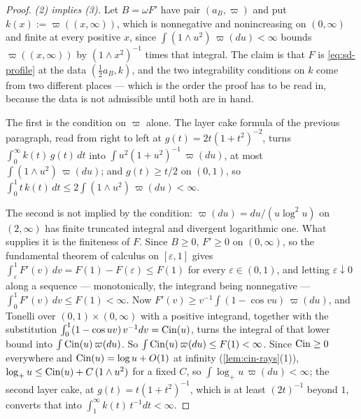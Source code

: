 \begin{proof}
\emph{(2) implies (3).} Let $B = \omega F'$ have pair $(a_B,\varpi)$ and put
$k(x) := \varpi((x,\infty))$, which is nonnegative and nonincreasing on $(0,\infty)$ and finite
at every positive $x$, since $\int (1 \wedge u^2)\,\varpi(du) < \infty$ bounds
$\varpi((x,\infty))$ by $(1 \wedge x^2)^{-1}$ times that integral. The claim is that $F$ is
\ref{eq:sd-profile} at the data $(\tfrac12 a_B, k)$, and the two integrability conditions on
$k$ come from two different places --- which is the order the proof has to be read in, because
the data is not admissible until both are in hand.

The first is the \Levy{} condition on $\varpi$ alone. The layer cake formula of the previous
paragraph, read from right to left at $g(t) = 2t(1+t^2)^{-2}$, turns
$\int_0^\infty k(t)\,g(t)\,dt$ into $\int u^2(1+u^2)^{-1}\,\varpi(du)$, at most
$\int (1 \wedge u^2)\,\varpi(du)$; and $g(t) \ge t/2$ on $(0,1)$, so
$\int_0^1 t\,k(t)\,dt \le 2\int (1 \wedge u^2)\,\varpi(du) < \infty$.

The second is not implied by the \Levy{} condition: $\varpi(du) = du/(u\log^2 u)$ on $(2,\infty)$
has finite truncated integral and divergent logarithmic one. What supplies it is the finiteness
of $F$. Since $B \ge 0$, $F' \ge 0$ on $(0,\infty)$, so the fundamental theorem of calculus on
$[\varepsilon,1]$ gives $\int_\varepsilon^1 F'(v)\,dv = F(1) - F(\varepsilon) \le F(1)$ for
every $\varepsilon \in (0,1)$, and letting $\varepsilon \downarrow 0$ along a sequence ---
monotonically, the integrand being nonnegative --- $\int_0^1 F'(v)\,dv \le F(1) < \infty$.
Now $F'(v) \ge v^{-1}\int (1 - \cos vu)\,\varpi(du)$, and Tonelli over
$(0,1) \times (0,\infty)$ with a positive integrand, together with the substitution
$\int_0^1 (1 - \cos uv)\,v^{-1}dv = \operatorname{Cin}(u)$, turns the integral of that lower bound into
$\int \operatorname{Cin}(u)\,\varpi(du)$. So $\int \operatorname{Cin}(u)\,\varpi(du) \le F(1) < \infty$. Since
$\operatorname{Cin} \ge 0$ everywhere and $\operatorname{Cin}(u) = \log u + O(1)$ at infinity (\ref{lem:cin-rays}(1)),
$\log_+ u \le \operatorname{Cin}(u) + C\,(1 \wedge u^2)$ for a fixed $C$, so
$\int \log_+ u\,\varpi(du) < \infty$; the second layer cake, at $g(t) = t(1+t^2)^{-1}$, which
is at least $(2t)^{-1}$ beyond $1$, converts that into $\int_1^\infty k(t)\,t^{-1}dt < \infty$.


\end{proof}
